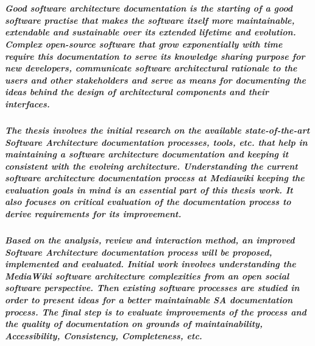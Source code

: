 \chapter{\abstractname}

\paragraph{Good software architecture documentation is the starting of a good software practise that makes the software itself more maintainable, extendable and sustainable over its extended lifetime and evolution. Complex open-source software that grow exponentially with time require this documentation to serve its  knowledge sharing purpose for new developers, communicate software architectural rationale to the users and other stakeholders and serve as means for documenting the ideas behind the design of architectural components and their interfaces.}
\paragraph{The thesis involves the initial research on the available state-of-the-art Software Architecture documentation processes, tools, etc. that help in maintaining a software architecture documentation and keeping it consistent with the evolving architecture. Understanding the current software architecture documentation process at Mediawiki keeping the evaluation goals in mind is an essential part of this thesis work. It also focuses on critical evaluation of the documentation process to derive requirements for its improvement.}
\paragraph{Based on the analysis, review and interaction method, an improved Software Architecture documentation process will be proposed, implemented and evaluated. Initial work involves understanding the MediaWiki software architecture complexities from an open social software perspective. Then existing software processes are studied in order to present ideas for a better maintainable SA documentation process. The final step is to evaluate improvements of the process and the quality of documentation on grounds of maintainability, Accessibility, Consistency, Completeness, etc.}
 



